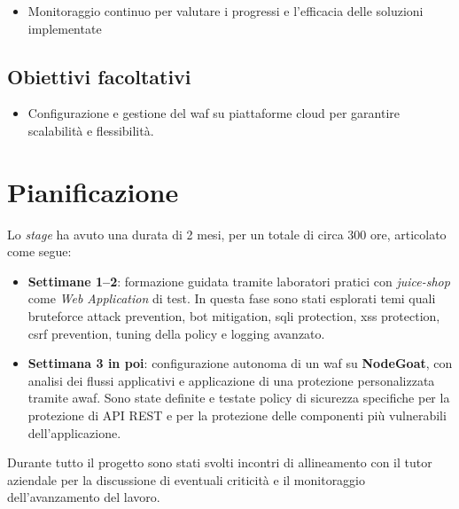 \begin{itemize}
    \item Monitoraggio continuo per valutare i progressi e l'efficacia delle soluzioni implementate
\end{itemize}

\subsection*{Obiettivi facoltativi}

\begin{itemize}
    \item Configurazione e gestione del \gls{waf} su piattaforme cloud per garantire scalabilità e flessibilità.
\end{itemize}

\section{Pianificazione}

Lo \emph{stage} ha avuto una durata di 2 mesi, per un totale di circa 300 ore, articolato come segue:

\begin{itemize}
    \item \textbf{Settimane 1--2}: formazione guidata tramite laboratori pratici con \emph{juice-shop} come \emph{Web Application} di test. In questa fase sono stati esplorati temi quali \gls{bruteforce} attack prevention, bot mitigation, \gls{sqli} protection, \gls{xss} protection, \gls{csrf} prevention, tuning della \gls{policy} e logging avanzato.
    \item \textbf{Settimana 3 in poi}: configurazione autonoma di un \gls{waf} su \textbf{NodeGoat}, con analisi dei flussi applicativi e applicazione di una protezione personalizzata tramite \gls{awaf}. Sono state definite e testate policy di sicurezza specifiche per la protezione di API REST e per la protezione delle componenti più vulnerabili dell'applicazione.
\end{itemize}

Durante tutto il progetto sono stati svolti incontri di allineamento con il tutor aziendale per la discussione di eventuali criticità e il monitoraggio dell'avanzamento del lavoro.

\clearpage


